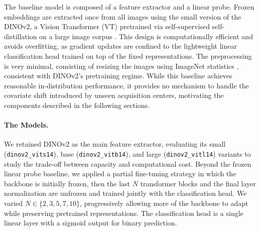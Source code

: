 \documentclass{midl}
\begin{document}
The baseline model is composed of a feature extractor and a linear probe. Frozen embeddings are extracted once from all images using the small version of the DINOv2, a Vision Transformer (VT) pretrained via self-supervised self-distillation on a large image corpus \cite{oquab2023dinov2}. This design is computationally efficient and avoids overfitting, as gradient updates are confined to the lightweight linear classification head trained on top of the fixed representations. The preprocessing is very minimal, consisting of resizing the images using ImageNet statistics \cite{deng2009imagenet}, consistent with DINOv2's pretraining regime. While this baseline achieves reasonable in-distribution performance, it provides no mechanism to handle the covariate shift introduced by unseen acquisition centers, motivating the components described in the following sections.

\paragraph{The Models.}

We retained DINOv2 \cite{oquab2023dinov2} as the main feature extractor, evaluating its small (\texttt{dinov2\_vits14}), base (\texttt{dinov2\_vitb14}), and large (\texttt{dinov2\_vitl14}) variants to study the trade-off between capacity and computational cost. Beyond the frozen linear probe baseline, we applied a partial fine-tuning strategy in which the backbone is initially frozen, then the last $N$ transformer blocks and the final layer normalization are unfrozen and trained jointly with the classification head. We varied $N \in \{2, 3, 5, 7, 10\}$, progressively allowing more of the backbone to adapt while preserving pretrained representations. The classification head is a single linear layer with a sigmoid output for binary prediction.
\end{document}
